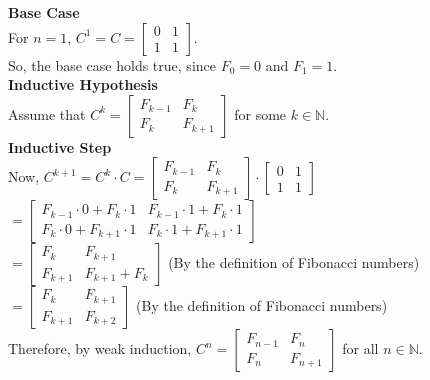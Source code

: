 \documentclass[a4paper]{article}
\begin{document}
\begin{enumerate}
\begin{enumerate}
        \textbf{Base Case}\\
        For \(n = 1\), \(C^1 = C = \begin{bmatrix} 0 & 1 \\ 1 & 1 \end{bmatrix}\).\\
        So, the base case holds true, since \(F_0 = 0\) and \(F_1 = 1\).\\

        \textbf{Inductive Hypothesis}\\
        Assume that \(C^k = \begin{bmatrix} F_{k-1} & F_k \\ F_k & F_{k+1} \end{bmatrix}\) for some \(k \in \mathbb{N}\).\\

        \textbf{Inductive Step}\\
        Now, \(C^{k+1} = C^k \cdot C = \begin{bmatrix} F_{k-1} & F_k \\ F_k & F_{k+1} \end{bmatrix} \cdot \begin{bmatrix} 0 & 1 \\ 1 & 1 \end{bmatrix}\)\\
        \(= \begin{bmatrix} F_{k-1} \cdot 0 + F_k \cdot 1 & F_{k-1} \cdot 1 + F_k \cdot 1 \\ F_k \cdot 0 + F_{k+1} \cdot 1 & F_k \cdot 1 + F_{k+1} \cdot 1 \end{bmatrix}\)\\
        \(= \begin{bmatrix} F_k & F_{k+1} \\ F_{k+1} & F_{k+1} + F_k \end{bmatrix}\) (By the definition of Fibonacci numbers)\\
        \(= \begin{bmatrix} F_k & F_{k+1} \\ F_{k+1} & F_{k+2} \end{bmatrix}\) (By the definition of Fibonacci numbers)\\

        Therefore, by weak induction, \(C^n = \begin{bmatrix} F_{n-1} & F_n \\ F_n & F_{n+1} \end{bmatrix}\) for all \(n \in \mathbb{N}\).\\


\end{enumerate}
\end{enumerate}
\end{document}
